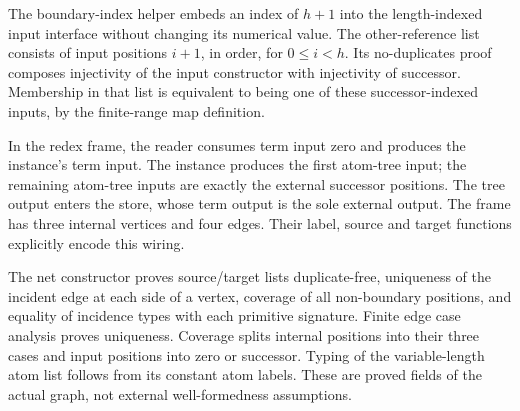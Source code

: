 


The boundary-index helper embeds an index of $h+1$ into the length-indexed
input interface without changing its numerical value. The other-reference
list consists of input positions $i+1$, in order, for $0\leq i<h$.
Its no-duplicates proof composes injectivity of the input constructor with
injectivity of successor. Membership in that list is equivalent to being
one of these successor-indexed inputs, by the finite-range map definition.





In the redex frame, the reader consumes term input zero and produces the
instance's term input. The instance produces the first atom-tree input; the
remaining atom-tree inputs are exactly the external successor positions.
The tree output enters the store, whose term output is the sole external
output. The frame has three internal vertices and four edges. Their label,
source and target functions explicitly encode this wiring.

The net constructor proves source/target lists duplicate-free, uniqueness of
the incident edge at each side of a vertex, coverage of all non-boundary
positions, and equality of incidence types with each primitive signature.
Finite edge case analysis proves uniqueness. Coverage splits internal
positions into their three cases and input positions into zero or successor.
Typing of the variable-length atom list follows from its constant atom labels.
These are proved fields of the actual graph, not external well-formedness
assumptions.




